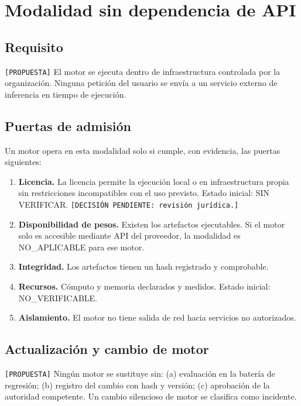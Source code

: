\documentclass[12pt]{article}
\begin{document}
\section{Modalidad sin dependencia de API}
\label{sec:sin_api}

\subsection{Requisito}

\texttt{[PROPUESTA]} El motor se ejecuta dentro de infraestructura controlada
por la organización. Ninguna petición del usuario se envía a un servicio
externo de inferencia en tiempo de ejecución.

\subsection{Puertas de admisión}

Un motor opera en esta modalidad solo si cumple, con evidencia, las puertas siguientes:

\begin{enumerate}[label=G\arabic*.]
    \item \textbf{Licencia.} La licencia permite la ejecución local o en infraestructura propia sin restricciones incompatibles con el uso previsto. Estado inicial: SIN VERIFICAR. \texttt{[DECISIÓN PENDIENTE: revisión jurídica.]}
    \item \textbf{Disponibilidad de pesos.} Existen los artefactos ejecutables. Si el motor solo es accesible mediante API del proveedor, la modalidad es NO\_APLICABLE para ese motor.
    \item \textbf{Integridad.} Los artefactos tienen un hash registrado y comprobable.
    \item \textbf{Recursos.} Cómputo y memoria declarados y medidos. Estado inicial: NO\_\allowbreak VERIFICABLE.
    \item \textbf{Aislamiento.} El motor no tiene salida de red hacia servicios no autorizados.
\end{enumerate}

\subsection{Actualización y cambio de motor}

\texttt{[PROPUESTA]} Ningún motor se sustituye sin: (a) evaluación en la
batería de regresión; (b) registro del cambio con hash y versión; (c)
aprobación de la autoridad competente. Un cambio silencioso de motor se
clasifica como incidente.
\end{document}
